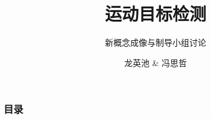 \documentclass[UTF8]{ctexbeamer}
\title{运动目标检测}
\subtitle{新概念成像与制导小组讨论}
\author{龙英池 \& 冯思哲}
\institute{HIT}
\begin{document}
\frame{\titlepage}

\begin{frame}
    \frametitle{目录}

    \tableofcontents

\end{frame}





\end{document}
